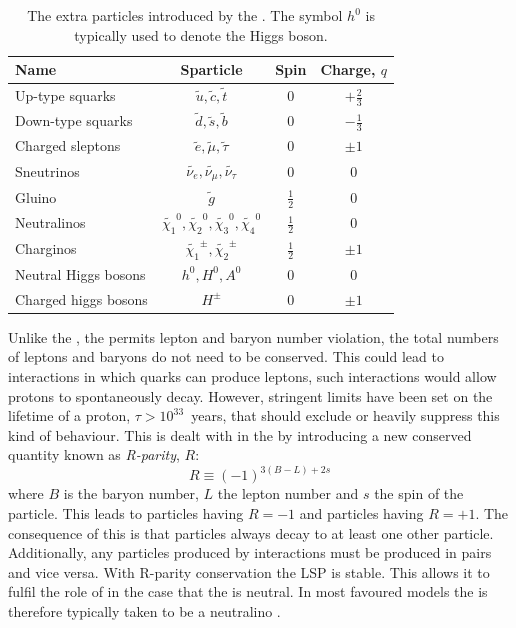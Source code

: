 \begin{table}
\begin{tabular}{|l|c|c|c|}
Name & Sparticle & Spin & Charge, $q$ \\
\hline
Up-type squarks & $\tilde{u},\tilde{c},\tilde{t}$ & 0 & $+\frac{2}{3}$ \\
Down-type squarks & $\tilde{d},\tilde{s},\tilde{b}$ & 0 & $-\frac{1}{3}$ \\
Charged sleptons & $\tilde{e},\tilde{\mu},\tilde{\tau}$ & 0 & $\pm1$ \\
Sneutrinos & $\tilde{\nu_{e}},\tilde{\nu_{\mu}},\tilde{\nu_{\tau}}$ & 0 & 0 \\
\hline
Gluino & $\tilde{g}$ & $\frac{1}{2}$ & 0 \\
Neutralinos &
$\tilde{\chi_{1}}^0,\tilde{\chi_{2}}^0,\tilde{\chi_{3}}^0,\tilde{\chi_{4}}^0$
& $\frac{1}{2}$ & 0  \\
Charginos & $\tilde{\chi_{1}}^{\pm},\tilde{\chi_{2}}^{\pm}$ &
$\frac{1}{2}$ & $\pm1$ \\
\hline
Neutral Higgs bosons & $h^0,H^0,A^0$ & 0 & 0 \\
Charged higgs bosons & $H^{\pm}$ & 0 & $\pm1$ \\
\end{tabular}
\caption{The extra particles introduced by the \MSSM. The symbol $h^0$
is typically used to denote the \SM Higgs boson.
\cite{Martin:1997ns}}
\label{tab:susy}
\end{table}

Unlike the \SM, the \MSSM permits lepton and baryon number violation,
the total numbers of leptons and baryons do not need to be conserved.
This could lead to interactions in which quarks can produce leptons,
such interactions would allow protons to spontaneously decay.
However, stringent limits have been set on the lifetime of a proton,
$\tau>10^{33}$~years, that should exclude or heavily suppress this
kind of behaviour. This is dealt with in the \MSSM by introducing a
new conserved quantity known as \emph{R-parity}, $R$:
\begin{equation}
R\equiv (-1)^{3(B-L)+2s}
\end{equation}
where $B$ is the baryon number, $L$ the lepton number and $s$ the spin
of the particle. This leads to \SUSY particles having $R=-1$ and \SM
particles having $R=+1$. The consequence of this is that \SUSY particles
always decay to at least one other \SUSY particle. Additionally, any
\SUSY particles produced by \SM interactions must be produced in
pairs and vice versa. With R-parity conservation the \acf{LSP} is
stable. This allows it to fulfil the role of \DM in the case that
the \LSP is neutral. In most favoured \SUSY models the \LSP is
therefore typically taken to be a neutralino \cite{Farrar:1978xj}.

